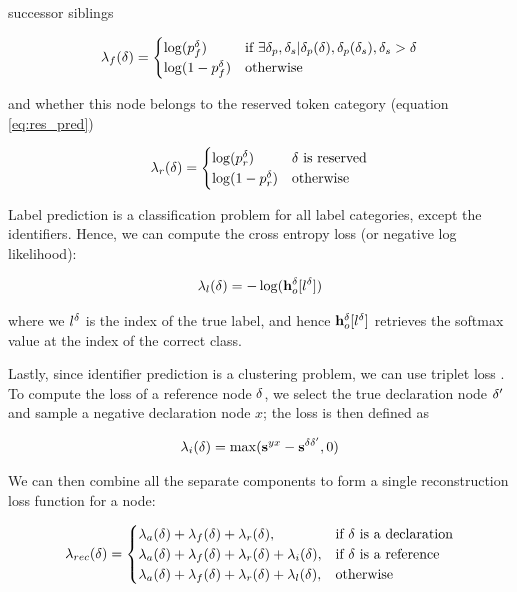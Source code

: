 successor siblings

\begin{align}
    \lambda_{f}(\delta) = \begin{cases}
        \log(p^\delta_f) & \text{if }\exists \delta_p, \delta_s | \delta_p(\delta), \delta_p(\delta_s), \delta_s > \delta \\
        \log(1- p^\delta_f) & \text{otherwise}
    \end{cases}
\end{align}

and whether this node belongs to the reserved token category (equation \ref{eq:res_pred})

\begin{align}
    \lambda_{r}(\delta) = \begin{cases}
        \log(p^\delta_r)  & \delta \text{ is reserved} \\
        \log(1- p^\delta_r)  & \text{otherwise}
    \end{cases}
\end{align}

Label prediction is a classification problem for all label categories, except the identifiers.
Hence, we can compute the cross entropy loss (or negative log likelihood):

\begin{align}
    \lambda_{l}(\delta) = - \log(\mathbf{h}_o^\delta[l^\delta])
\end{align}

\noindent where we $l^\delta$ is the index of the true label, and hence $\mathbf{h}_o^\delta[l^\delta]$ retrieves the softmax value at the index of the correct class. 

Lastly, since identifier prediction is a clustering problem, we can use triplet loss \cite{chechik2010large}. 
To compute the loss of a reference node $\delta$, we select the true declaration node $\delta'$ and sample a negative declaration node $x$; the loss is then defined as

\begin{align}
    \lambda_i(\delta)=\max(\mathbf{s}^{yx} - \mathbf{s}^{\delta \delta'},0)
\end{align}

\noindent We can then combine all the separate components to form a single reconstruction loss function for a node:

\begin{small}
\begin{align}
   \lambda_{rec}(\delta) = 
\begin{cases}
    \lambda_{a}(\delta) + \lambda_{f}(\delta) + \lambda_{r}(\delta),& \text{if } \delta \text{ is a declaration} \\
    \lambda_{a}(\delta) + \lambda_{f}(\delta) + \lambda_{r}(\delta) + \lambda_{i}(\delta),& \text{if } \delta \text{ is a reference} \\
    \lambda_{a}(\delta) + \lambda_{f}(\delta) + \lambda_{r}(\delta) + \lambda_{l}(\delta),& \text{otherwise}
\end{cases}
\end{align}
\end{small}

